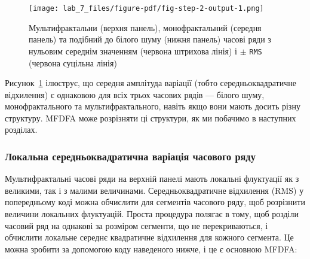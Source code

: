 \documentclass[
  letterpaper,
]{report}
\begin{document}
\begin{figure}[H]

{\centering \texttt{[image: lab\_7\_files/figure-pdf/fig-step-2-output-1.png]}

}

\caption{\label{fig-step-2}Мультифрактальни (верхня панель),
монофрактальний (середня панель) та подібний до білого шуму (нижня
панель) часові ряди з нульовим середнім значенням (червона штрихова
лінія) і \(\pm\) \texttt{RMS} (червона суцільна лінія)}

\end{figure}

Рисунок~\ref{fig-step-2} ілюструє, що середня амплітуда варіації (тобто
середньоквадратичне відхилення) є однаковою для всіх трьох часових рядів
--- білого шуму, монофрактального та мультифрактального, навіть якщо
вони мають досить різну структуру. MFDFA може розрізняти ці структури,
як ми побачимо в наступних розділах.

\hypertarget{ux43bux43eux43aux430ux43bux44cux43dux430-ux441ux435ux440ux435ux434ux43dux44cux43eux43aux432ux430ux434ux440ux430ux442ux438ux447ux43dux430-ux432ux430ux440ux456ux430ux446ux456ux44f-ux447ux430ux441ux43eux432ux43eux433ux43e-ux440ux44fux434ux443}{%
\subsubsection{Локальна середньоквадратична варіація часового
ряду}\label{ux43bux43eux43aux430ux43bux44cux43dux430-ux441ux435ux440ux435ux434ux43dux44cux43eux43aux432ux430ux434ux440ux430ux442ux438ux447ux43dux430-ux432ux430ux440ux456ux430ux446ux456ux44f-ux447ux430ux441ux43eux432ux43eux433ux43e-ux440ux44fux434ux443}}

Мультифрактальні часові ряди на верхній панелі мають локальні флуктуації
як з великими, так і з малими величинами. Середньоквадратичне відхилення
(RMS) у попередньому коді можна обчислити для сегментів часового ряду,
щоб розрізнити величини локальних флуктуацій. Проста процедура полягає в
тому, щоб розділи часовий ряд на однакові за розміром сегменти, що не
перекриваються, і обчислити локальне середнє квадратичне відхилення для
кожного сегмента. Це можна зробити за допомогою коду наведеного нижче, і
це є основною MFDFA:
\end{document}
